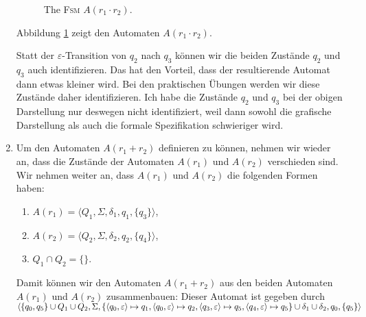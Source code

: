 \begin{enumerate}
      \begin{figure}[!ht]
        \centering
      \caption{The \textsc{Fsm} $A(r_1 \cdot r_2)$.}
      \label{fig:aConcat.eps}
      \end{figure}
      Abbildung \ref{fig:aConcat.eps} zeigt den Automaten $A(r_1 \cdot r_2)$.

      Statt der $\varepsilon$-Transition von $q_2$ nach $q_3$ k\"onnen wir die beiden
      Zust\"ande $q_2$ und $q_3$ auch identifizieren.  Das hat den Vorteil, dass der
      resultierende Automat dann etwas kleiner wird.  Bei den praktischen \"Ubungen werden
      wir diese Zust\"ande daher identifizieren.  Ich habe die Zust\"ande $q_2$ und $q_3$ bei der obigen
      Darstellung nur deswegen nicht identifiziert, weil dann sowohl die grafische Darstellung als
      auch die formale Spezifikation schwieriger wird.
\item Um den Automaten $A(r_1 + r_2)$ definieren zu k\"onnen, nehmen wir wieder an, dass die
      Zust\"ande der Automaten $A(r_1)$ und $A(r_2)$ verschieden sind.  
      Wir nehmen weiter an, dass $A(r_1)$ und $A(r_2)$ die folgenden Formen haben:
      \begin{enumerate}
      \item $A(r_1) = \langle Q_1, \Sigma, \delta_1, q_1, \{ q_3 \}\rangle$,
      \item $A(r_2) = \langle Q_2, \Sigma, \delta_2, q_2, \{ q_4 \}\rangle$,
      \item $Q_1 \cap Q_2 = \{\}$.
      \end{enumerate}
      Damit k\"onnen wir den Automaten $A(r_1 + r_2)$ aus den beiden Automaten $A(r_1)$ und
      $A(r_2)$ zusammenbauen:  Dieser Automat ist gegeben durch
      \\[0.2cm]
      \hspace*{0.8cm}
       $\langle \{ q_0, q_5 \} \cup Q_1 \cup Q_2, \Sigma, 
                \{ \pair(q_0,\varepsilon) \mapsto q_1, \pair(q_0,\varepsilon) \mapsto q_2,
                   \pair(q_3,\varepsilon) \mapsto q_5, \pair(q_4,\varepsilon) \mapsto q_5 \} 
                   \cup \delta_1 \cup \delta_2, q_0, \{ q_5 \} \rangle$


\end{enumerate}
